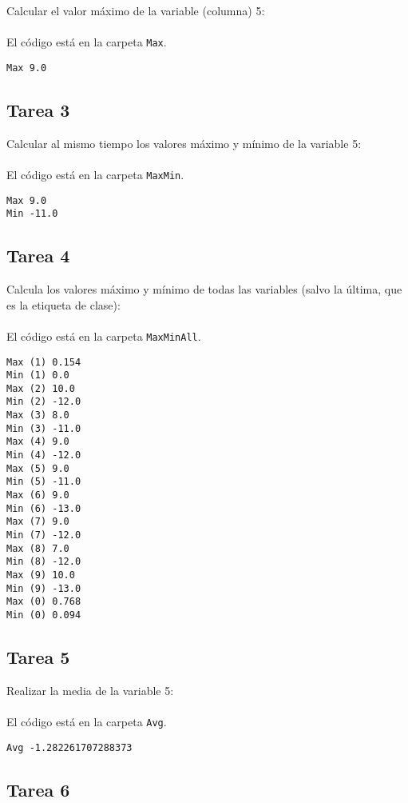 Calcular el valor máximo de la variable (columna) 5:
\\ \\
El código está en la carpeta \texttt{Max}.

\begin{lstlisting}
Max 9.0
\end{lstlisting}

\subsection{Tarea 3}

Calcular al mismo tiempo los valores máximo y mínimo de la variable 5:
\\ \\
El código está en la carpeta \texttt{MaxMin}.

\begin{lstlisting}
Max 9.0
Min -11.0
\end{lstlisting}

\subsection{Tarea 4}

Calcula los valores máximo y mínimo de todas las variables (salvo la última, que es la etiqueta de clase):
\\ \\
El código está en la carpeta \texttt{MaxMinAll}.

\begin{lstlisting}
Max (1) 0.154
Min (1) 0.0
Max (2) 10.0
Min (2) -12.0
Max (3) 8.0
Min (3) -11.0
Max (4) 9.0
Min (4) -12.0
Max (5) 9.0
Min (5) -11.0
Max (6) 9.0
Min (6) -13.0
Max (7) 9.0
Min (7) -12.0
Max (8) 7.0
Min (8) -12.0
Max (9) 10.0
Min (9) -13.0
Max (0) 0.768
Min (0) 0.094
\end{lstlisting}

\subsection{Tarea 5}

Realizar la media de la variable 5:
\\ \\
El código está en la carpeta \texttt{Avg}.

\begin{lstlisting}
Avg -1.282261707288373
\end{lstlisting}

\subsection{Tarea 6}

